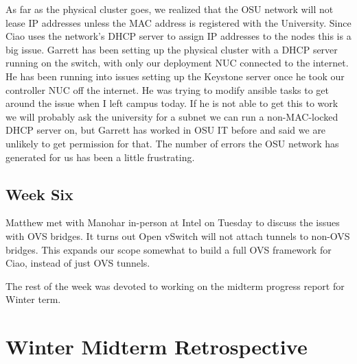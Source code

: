 \documentclass[10pt,onecolumn,journal,draftclsnofoot]{IEEEtran}
\begin{document}
As far as the physical cluster goes, we realized that the OSU network will not
lease IP addresses unless the MAC address is registered with the University.
Since Ciao uses the network's DHCP server to assign IP addresses to the nodes
this is a big issue. Garrett has been setting up the physical cluster with a
DHCP server running on the switch, with only our deployment NUC connected to the
internet. He has been running into issues setting up the Keystone server once he
took our controller NUC off the internet. He was trying to modify ansible tasks
to get around the issue when I left campus today. If he is not able to get this
to work we will probably ask the university for a subnet we can run a
non-MAC-locked DHCP server on, but Garrett has worked in OSU IT before and said
we are unlikely to get permission for that. The number of errors the OSU network
has generated for us has been a little frustrating.

\subsection{Week Six}

Matthew met with Manohar in-person at Intel on Tuesday to discuss the issues
with OVS bridges. It turns out Open vSwitch will not attach tunnels to non-OVS
bridges. This expands our scope somewhat to build a full OVS framework for Ciao,
instead of just OVS tunnels.

The rest of the week was devoted to working on the midterm progress report for
Winter term.

\section{Winter Midterm Retrospective}
\end{document}
